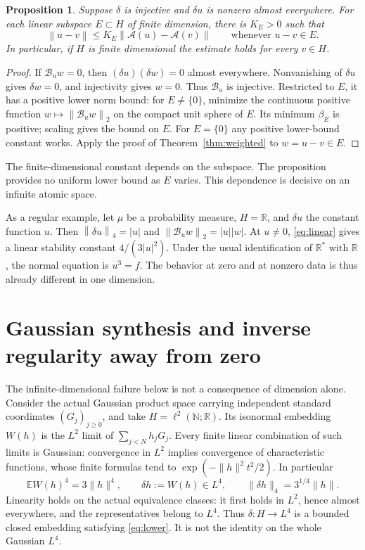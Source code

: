 \documentclass[11pt]{article}
\newtheorem{proposition}[theorem]{Proposition}
\theoremstyle{remark}\newtheorem{remark}[theorem]{Remark}
\newcommand{\R}{\mathbb R}
\newcommand{\N}{\mathbb N}
\newcommand{\norm}[1]{\left\lVert#1\right\rVert}
\newcommand{\A}{\mathcal A}
\newcommand{\B}{\mathcal B}
\begin{document}
\begin{proposition}\label{prop:finite}
Suppose $\delta$ is injective and $\delta u$ is nonzero almost everywhere.
For each linear subspace $E\subset H$ of finite dimension, there is
$K_E>0$ such that
\begin{equation}\label{eq:finite}
 \norm{u-v}\leq K_E\norm{\A(u)-\A(v)}
 \qquad\text{whenever }u-v\in E.
\end{equation}
In particular, if $H$ is finite dimensional the estimate holds for
every $v\in H$.
\end{proposition}
\begin{proof}
If $\B_uw=0$, then $(\delta u)(\delta w)=0$ almost everywhere.
Nonvanishing of $\delta u$ gives $\delta w=0$, and injectivity gives
$w=0$. Thus $\B_u$ is injective. Restricted to $E$, it has a positive
lower norm bound: for $E\neq\{0\}$, minimize the continuous positive
function $w\mapsto\norm{\B_uw}_2$ on the compact unit sphere of $E$.
Its minimum $\beta_E$ is positive; scaling gives the bound on $E$.
For $E=\{0\}$ any positive lower-bound constant works. Apply the proof
of Theorem~\ref{thm:weighted} to $w=u-v\in E$.
\end{proof}

The finite-dimensional constant depends on the subspace. The
proposition provides no uniform lower bound as $E$ varies. This
dependence is decisive on an infinite atomic space.

As a regular example, let $\mu$ be a probability measure, $H=\R$,
and $\delta u$ the constant function $u$. Then
$\norm{\delta u}_4=|u|$ and $\norm{\B_uw}_2=|u||w|$.
At $u\neq0$, \eqref{eq:linear} gives a linear stability constant
$4/(3|u|^2)$. Under the usual identification of $\R^*$ with $\R$,
the normal equation is $u^3=f$. The behavior at zero and at nonzero
data is thus already different in one dimension.


\section{Gaussian synthesis and inverse regularity away from zero}
The infinite-dimensional failure below is not a consequence of dimension
alone. Consider the actual Gaussian product space carrying independent
standard coordinates $(G_j)_{j\geq0}$, and take $H=\ell^2(\N;\R)$.
Its isonormal embedding $W(h)$ is the $L^2$ limit of
$\sum_{j<N}h_jG_j$. Every finite linear combination of such limits is
Gaussian: convergence in $L^2$ implies convergence of characteristic
functions, whose finite formulas tend to
$\exp(-\|h\|^2t^2/2)$. In particular
\[
 \mathbb E W(h)^4=3\|h\|^4,
 \qquad \delta h:=W(h)\in L^4,
 \qquad \|\delta h\|_4=3^{1/4}\|h\|.
\]
Linearity holds on the actual equivalence classes: it first holds in
$L^2$, hence almost everywhere, and the representatives belong to
$L^4$. Thus $\delta:H\to L^4$ is a bounded closed embedding satisfying
\eqref{eq:lower}. It is not the identity on the whole Gaussian $L^4$.
\end{document}
